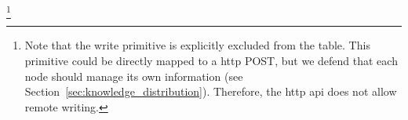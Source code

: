 \footnote{
  Note that the write primitive is explicitly excluded from the table.
  This primitive could be directly mapped to a \acs{http} POST,
  but we defend that each node should manage its own information
  (see Section~\ref{sec:knowledge_distribution}).
  Therefore, the \acs{http} \acs{api} does not allow remote writing.
}